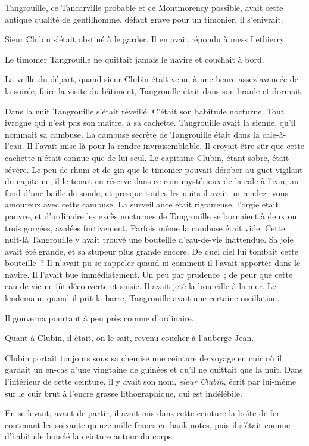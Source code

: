 \documentclass[french,twoside]{book} %
\begin{document}
Tangrouille, ce Tancarville probable et ce Montmorency possible, avait cette antique qualité de gentilhomme, défaut grave pour un timonier, il s’enivrait.\par
Sieur Clubin s’était obstiné à le garder. Il en avait répondu à mess Lethierry.\par
Le timonier Tangrouille ne quittait jamais le navire et couchait à bord.\par
La veille du départ, quand sieur Clubin était venu, à une heure assez avancée de la soirée, faire la visite du bâtiment, Tangrouille était dans son branle et dormait.\par
Dans la nuit Tangrouille s’était réveillé. C’était son habitude nocturne. Tout ivrogne qui n’est pas son maître, a sa cachette. Tangrouille avait la sienne, qu’il nommait sa cambuse. La cambuse secrète de Tangrouille était dans la cale-à-l’eau. Il l’avait mise là pour la rendre invraisemblable. Il croyait être sûr que cette cachette n’était connue que de lui seul. Le capitaine Clubin, étant sobre, était sévère. Le peu de rhum et de gin que le timonier pouvait dérober au guet vigilant du capitaine, il le tenait en réserve dans ce coin mystérieux de la cale-à-l’eau, au fond d’une baille de sonde, et presque toutes les nuits il avait un rendez- vous amoureux avec cette cambuse. La surveillance était rigoureuse, l’orgie était pauvre, et d’ordinaire les excès nocturnes de Tangrouille se bornaient à deux ou trois gorgées, avalées furtivement. Parfois même la cambuse était vide. Cette nuit-là Tangrouille y avait trouvé une bouteille d’eau-de-vie inattendue. Sa joie avait été grande, et sa stupeur plus grande encore. De quel ciel lui tombait cette bouteille ? Il n’avait pu se rappeler quand ni comment il l’avait apportée dans le navire. Il l’avait bue immédiatement. Un peu par prudence ; de peur que cette eau-de-vie ne fût découverte et saisie. Il avait jeté la bouteille à la mer. Le lendemain, quand il prit la barre, Tangrouille avait une certaine oscillation.\par
Il gouverna pourtant à peu près comme d’ordinaire.\par
Quant à Clubin, il était, on le sait, revenu coucher à l’auberge Jean.\par
Clubin portait toujours sous sa chemise une ceinture de voyage en cuir où il gardait un en-cas d’une vingtaine de guinées et qu’il ne quittait que la nuit. Dans l’intérieur de cette ceinture, il y avait son nom, \emph{sieur Clubin}, écrit par lui-même sur le cuir brut à l’encre grasse lithographique, qui est indélébile.\par
En se levant, avant de partir, il avait mis dans cette ceinture la boîte de fer contenant les soixante-quinze mille francs en bank-notes, puis il s’était comme d’habitude bouclé la ceinture autour du corps.
\end{document}
